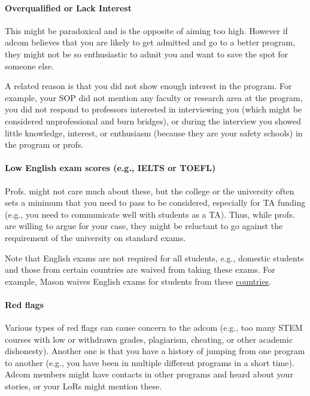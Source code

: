 \documentclass[oneside,11pt,dvipsnames]{book}
\begin{document}
\paragraph{Overqualified or Lack Interest}  This might be paradoxical and is the opposite of aiming too high. However if adcom believes that you are likely to get admitted and go to a better program, they might not be so enthusiastic to admit you and want to save the spot for someone else.

A related reason is that you did not show enough interest in the program.
For example, your SOP did not mention any faculty or research area at the program, you did not respond to professors interested in interviewing you (which might be considered unprofessional and burn bridges), or during the interview you showed little knowledge, interest, or enthusiasm (because they are your safety schools) in the program or profs.


\paragraph{Low English exam scores (e.g., IELTS or TOEFL)}  Profs. might not care much about these, but the college or the university often sets a minimum that you need to pass to be considered, especially for TA funding (e.g., you need to communicate well with students as a TA).  Thus, while profs. are willing to argue for your case, they might be reluctant to go against the requirement of the university on standard exams.  

Note that English exams are not required for all students, e.g., domestic students and those from certain countries are waived from taking these exams.  For example, Mason waives English exams for students from these \href{https://github.com/dynaroars/dynaroars.github.io/wiki/About-Mason#standard-tests-waiver-eligible-countries}{countries}.


\paragraph{Red flags} Various types of red flags can cause concern to the adcom (e.g., too many STEM courses with low or withdrawn grades, plagiarism, cheating, or other academic dishonesty). Another one is that you have a history of jumping from one program to another (e.g., you have been in multiple different programs in a short time). Adcom members might have contacts in other programs and heard about your stories, or your LoRs might mention these.
\end{document}
